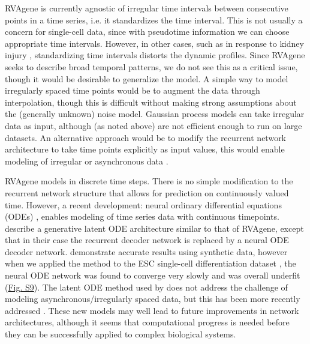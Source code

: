 RVAgene is currently agnostic of irregular time intervals between consecutive points in a time series,  i.e. it standardizes the time interval. This is not usually a concern for single-cell data, since with pseudotime information we can choose appropriate time intervals. However, in other cases, such as in response to kidney injury \citep{liu2017molecular}, standardizing time intervals distorts the dynamic profiles. Since RVAgene seeks to describe broad temporal patterns, we do not see this as a critical issue, though it would be desirable to generalize the model. A simple way to model irregularly spaced time points would be to augment the data through interpolation, though this is difficult without making strong assumptions about the (generally unknown) noise model. Gaussian process models \citep{McDowell2018, hensman2013hierarchical} can take irregular data as input, although (as noted above) are not efficient enough to run on large datasets. An alternative approach would be to modify the recurrent network architecture to take time points explicitly as input values, this would enable modeling of irregular or asynchronous data \citep{wu2018modeling}.
\par
RVAgene models in discrete time steps. There is no simple modification to the recurrent network structure that allows for prediction on continuously valued time. However, a recent development: neural ordinary differential equations (ODEs) \citep{chen2018neural}, enables modeling of time series data with continuous timepoints. \citet{chen2018neural} describe a generative latent ODE architecture similar to that of RVAgene, except that in their case the recurrent decoder network is replaced by a neural ODE decoder network. \citet{chen2018neural} demonstrate accurate results using synthetic data, however when we applied the method to the ESC single-cell differentiation dataset \citep{Klein2015}, the neural ODE network was found to converge very slowly and was overall underfit (\hyperref[supp]{Fig. S9}). The latent ODE method used by \citet{chen2018neural} does not address the challenge of modeling asynchronous/irregularly spaced data, but this has been more recently addressed \citep{rubanova2019latent}. These new models may well lead to future improvements in network architectures, although it seems that computational progress is needed before they can be successfully applied to complex biological systems.
\par 
